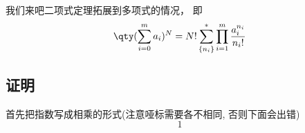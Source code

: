 

我们来吧二项式定理拓展到多项式的情况， 即
\begin{equation}
\qty(\sum_{i = 0}^m a_i)^N = N! \sum_{\{n_i\}}^* \prod_{i = 1}^m \frac{a_i^{n_i}}{n_i!}
\end{equation}

\subsection{证明}
首先把指数写成相乘的形式(注意哑标需要各不相同, 否则下面会出错)
\begin{equation}
1
\end{equation}
